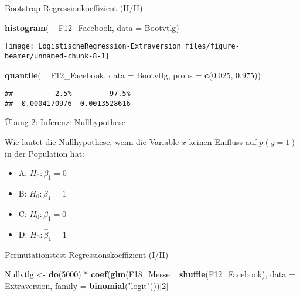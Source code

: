 \documentclass[ignorenonframetext,]{beamer}
\newenvironment{Shaded}{\begin{snugshade}}{\end{snugshade}}
\newcommand{\KeywordTok}[1]{\textcolor[rgb]{0.13,0.29,0.53}{\textbf{{#1}}}}
\newcommand{\DataTypeTok}[1]{\textcolor[rgb]{0.13,0.29,0.53}{{#1}}}
\newcommand{\DecValTok}[1]{\textcolor[rgb]{0.00,0.00,0.81}{{#1}}}
\newcommand{\FloatTok}[1]{\textcolor[rgb]{0.00,0.00,0.81}{{#1}}}
\newcommand{\StringTok}[1]{\textcolor[rgb]{0.31,0.60,0.02}{{#1}}}
\newcommand{\NormalTok}[1]{{#1}}
\providecommand{\tightlist}{%
  \setlength{\itemsep}{0pt}\setlength{\parskip}{0pt}}
\begin{document}
\begin{frame}[fragile]{Bootstrap Regressionkoeffizient (II/II)}

\begin{Shaded}
\begin{Highlighting}[]
\KeywordTok{histogram}\NormalTok{( ~}\StringTok{ }\NormalTok{F12_Facebook, }\DataTypeTok{data =} \NormalTok{Bootvtlg)}
\end{Highlighting}
\end{Shaded}

\begin{center}\texttt{[image: LogistischeRegression-Extraversion\_files/figure-beamer/unnamed-chunk-8-1]} \end{center}

\begin{Shaded}
\begin{Highlighting}[]
\KeywordTok{quantile}\NormalTok{( ~}\StringTok{ }\NormalTok{F12_Facebook, }\DataTypeTok{data =} \NormalTok{Bootvtlg, }
          \DataTypeTok{probs =} \KeywordTok{c}\NormalTok{(}\FloatTok{0.025}\NormalTok{, }\FloatTok{0.975}\NormalTok{))}
\end{Highlighting}
\end{Shaded}

\begin{verbatim}
##          2.5%         97.5% 
## -0.0004170976  0.0013528616
\end{verbatim}

\end{frame}

\begin{frame}{Übung 2: Inferenz: Nullhypothese}

Wie lautet die Nullhypothese, wenn die Variable \(x\) keinen Einfluss
auf \(p(y=1)\) in der Population hat:

\begin{itemize}
\tightlist
\item
  A: \(H_0: \beta_1=0\)
\item
  B: \(H_0: \beta_1=1\)
\item
  C: \(H_0: \hat{\beta}_1=0\)
\item
  D: \(H_0: \hat{\beta}_1=1\)
\end{itemize}

\end{frame}

\begin{frame}[fragile]{Permutationstest Regressionskoeffizient (I/II)}

\begin{Shaded}
\begin{Highlighting}[]
\NormalTok{Nullvtlg <-}\StringTok{ }\KeywordTok{do}\NormalTok{(}\DecValTok{5000}\NormalTok{) *}
\StringTok{  }\KeywordTok{coef}\NormalTok{(}\KeywordTok{glm}\NormalTok{(F18_Messe ~}\StringTok{ }\KeywordTok{shuffle}\NormalTok{(F12_Facebook), }
           \DataTypeTok{data =} \NormalTok{Extraversion,}
           \DataTypeTok{family =} \KeywordTok{binomial}\NormalTok{(}\StringTok{"logit"}\NormalTok{)))[}\DecValTok{2}\NormalTok{]}
\end{Highlighting}
\end{Shaded}

\end{frame}
\end{document}

